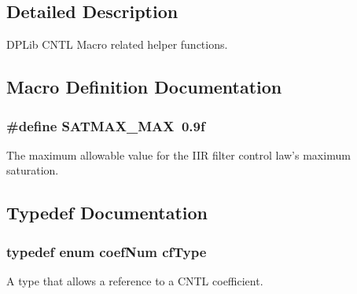\subsection{Detailed Description}
D\-P\-Lib C\-N\-T\-L Macro related helper functions. 

\subsection{Macro Definition Documentation}
\hypertarget{a00009_a64fd24fd8ffc66895ab057370d1c10f9}{
\subsubsection[{S\-A\-T\-M\-A\-X\-\_\-\-M\-A\-X}]{\setlength{\rightskip}{0pt plus 5cm}\#define S\-A\-T\-M\-A\-X\-\_\-\-M\-A\-X~0.\-9f}}\label{a00009_a64fd24fd8ffc66895ab057370d1c10f9}
The maximum allowable value for the I\-I\-R filter control law's maximum saturation. 

\subsection{Typedef Documentation}
\hypertarget{a00009_ac340fbbc5919954c173757935549588f}{
\subsubsection[{cf\-Type}]{\setlength{\rightskip}{0pt plus 5cm}typedef enum {\bf coef\-Num} {\bf cf\-Type}}}\label{a00009_ac340fbbc5919954c173757935549588f}
A type that allows a reference to a C\-N\-T\-L coefficient. 

